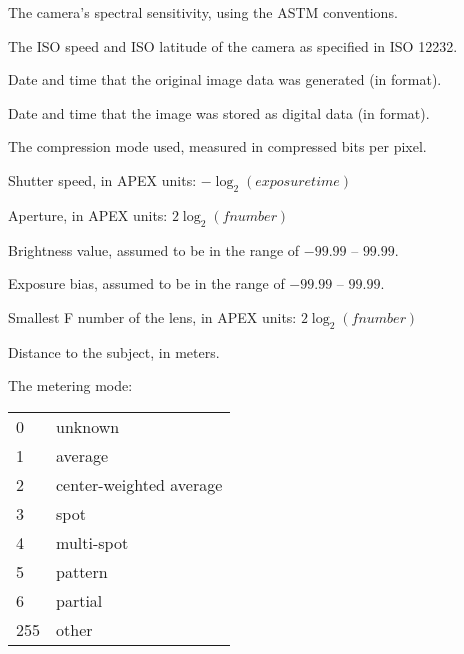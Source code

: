 The camera's spectral sensitivity, using the ASTM conventions.
\apiend

The ISO speed and ISO latitude of the camera as specified in ISO 12232.
\apiend


Date and time that the original image data was generated (in
 format).
\apiend

Date and time that the image was stored as digital data (in
 format).
\apiend

The compression mode used, measured in compressed bits per pixel.
\apiend

Shutter speed, in APEX units: $-\log_2 (\mathit{exposure time})$
\apiend

Aperture, in APEX units: $2 \log_2 (\mathit{fnumber})$
\apiend

Brightness value, assumed to be in the range of $-99.99$ -- $99.99$.
\apiend

Exposure bias, assumed to be in the range of $-99.99$ -- $99.99$.
\apiend

Smallest F number of the lens, in APEX units: $2 \log_2 (\mathit{fnumber})$
\apiend

Distance to the subject, in meters.
\apiend

The metering mode:

\medskip

\begin{tabular}{p{0.3in} p{4in}}
0 & unknown \\
1 & average \\
2 & center-weighted average \\
3 & spot \\
4 & multi-spot \\
5 & pattern \\
6 & partial \\
255 & other
\end{tabular}
\apiend

